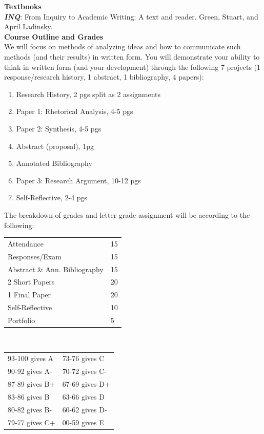 \documentclass[11pt]{article}
\begin{document}
   {\bf Textbooks}\\
{\bf \textsl {INQ}}: From Inquiry to Academic Writing: A text and reader. Green, Stuart, and April Ladinsky.
   \ \\

   {\bf Course Outline and Grades}\\
   We will focus on methods of analyzing ideas and how to communicate such methods (and their results) in written form. You will demonstrate your ability to think in written form (and your development) through the following 7 projects (1 response/research history, 1 abstract, 1 bibliography, 4 papers):
   \begin{enumerate}
     \item Research History, 2 pgs split as 2 assignments
     \item Paper 1: Rhetorical Analysis, 4-5 pgs
     \item Paper 2: Synthesis, 4-5 pgs
     \item Abstract (proposal), 1pg 
      \item Annotated Bibliography
     \item Paper 3: Research Argument, 10-12 pgs
    \item Self-Reflective, 2-4 pgs
   \end{enumerate}

The breakdown of grades and letter grade assignment will be according to the following:
\vskip 2mm
  
\begin{tabular}{|l|l|}
\hline
Attendance & 15\\
Responses/Exam & 15\\
Abstract \& Ann. Bibliography & 15\\
2 Short Papers & 20\\
1 Final Paper & 20\\
Self-Reflective & 10\\  
Portfolio & 5\\
\hline
\end{tabular} \  \  \  \  \ \begin{tabular}{|l|l|}
   \hline
   93-100 gives A &  73-76 gives C\\
   90-92 gives A- & 70-72 gives C-\\
   87-89 gives B+ & 67-69 gives D+\\
   83-86 gives B & 63-66 gives D\\
   80-82 gives B- & 60-62 gives D-\\
   79-77 gives C+ & 00-59 gives E\\
   \hline 
   \end{tabular}
   \ \\
\newtheorem{comment}{Comment}

 
\end{document}
